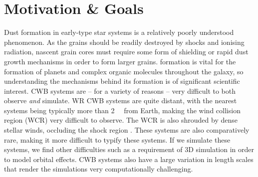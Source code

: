 \section{Motivation \& Goals}
\label{sec:projectgoals}

Dust formation in early-type star systems is a relatively poorly understood phenomenon.
As the grains should be readily destroyed by shocks and ionising radiation, nascent grain cores must require some form of shielding or rapid dust growth mechanisms in order to form larger grains.
 formation is vital for the formation of planets and complex organic molecules throughout the galaxy, so understanding the mechanisms behind its formation is of significant scientific interest.
CWB systems are -- for a variety of reasons -- very difficult to both observe \emph{and} simulate.
WR CWB systems are quite distant, with the nearest systems being typically more than \SI{2}{\kilo\parsec} from Earth, making the wind collision region (WCR) very difficult to observe.
The WCR is also shrouded by dense stellar winds, occluding the shock region .
These systems are also comparatively rare, making it more difficult to typify these systems.
If we simulate these systems, we find other difficulties such as a requirement of 3D simulation in order to model orbital effects.
CWB systems also have a large variation in length scales that render the simulations very computationally challenging.

